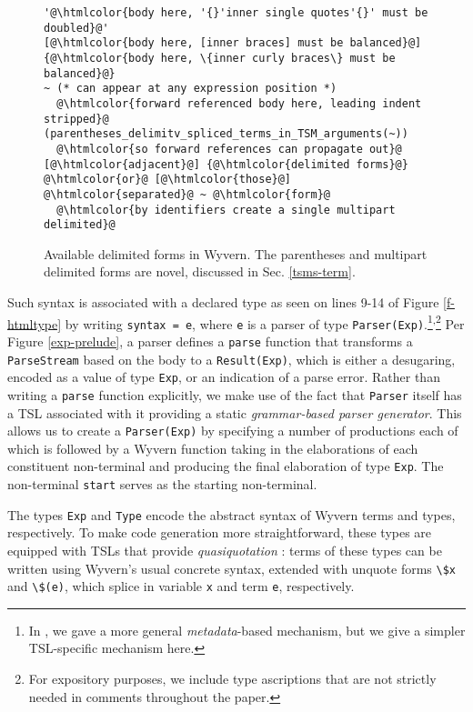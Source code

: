 \documentclass{sig-alternate}[10pt]
\newcommand{\htmlcolor}[1]{\textcolor[HTML]{339933}{#1}}
\newcommand{\mycaption}[1]{\vspace{-10px}\caption{#1}\vspace{-8px}}
\newcommand{\lstinlinew}[1]{\lstinline[style=wyvern]{#1}}
\begin{document}
\begin{figure}[t]
\begin{lstlisting}[style=wyvern,numbers=none,xleftmargin=0px,framexleftmargin=0px]
'@\htmlcolor{body here, '{}'inner single quotes'{}' must be doubled}@'
[@\htmlcolor{body here, [inner braces] must be balanced}@]
{@\htmlcolor{body here, \{inner curly braces\} must be balanced}@}
~ (* can appear at any expression position *)
  @\htmlcolor{forward referenced body here, leading indent stripped}@
(parentheses_delimitv_spliced_terms_in_TSM_arguments(~)) 
  @\htmlcolor{so forward references can propagate out}@
[@\htmlcolor{adjacent}@] {@\htmlcolor{delimited forms}@} @\htmlcolor{or}@ [@\htmlcolor{those}@] @\htmlcolor{separated}@ ~ @\htmlcolor{form}@
  @\htmlcolor{by identifiers create a single multipart delimited}@
\end{lstlisting}
\mycaption{Available delimited forms in Wyvern. The parentheses and multipart delimited forms are novel, discussed in Sec. \ref{tsms-term}.}
\label{f-delimited}
\end{figure}

Such syntax is associated with a declared type as seen on lines 9-14 of Figure \ref{f-htmltype} by writing \lstinline[style=wyvern]{syntax = e}, where \lstinlinew{e} is a parser of type \lstinlinew{Parser(Exp)}.\footnote{ In \cite{TSLs}, we gave a more general \emph{metadata}-based mechanism, but we give a simpler TSL-specific mechanism here.}\textsuperscript{,}\footnote{ For expository purposes, we include type ascriptions that are not strictly needed in comments throughout the paper.} Per  Figure \ref{exp-prelude}, a parser defines a \lstinlinew{parse} function that transforms a \lstinlinew{ParseStream} based on the body to a \lstinlinew{Result(Exp)}, which is either a desugaring, encoded as a value of type \lstinlinew{Exp}, or an indication of a parse error. Rather than writing a \lstinlinew{parse} function explicitly, we make use of the fact that \lstinlinew{Parser} itself has a TSL associated with it providing a static \emph{grammar-based parser generator}. This allows us to create a \lstinlinew{Parser(Exp)} by specifying a number of productions each of which is followed by a Wyvern function taking in the elaborations of each constituent non-terminal and producing the final elaboration of type \lstinlinew{Exp}. The non-terminal \lstinlinew{start} serves as the starting non-terminal. 

The types \lstinlinew{Exp} and \lstinlinew{Type} encode the abstract syntax of Wyvern terms and types, respectively. To make code generation more straightforward, these types are equipped with TSLs that provide \emph{quasiquotation}  \cite{quine40book,Bawd99a,ScalaMacros2013}: terms of these types  can be written using Wyvern's usual concrete syntax, extended with unquote forms \lstinlinew{\$x} and \lstinlinew{\$(e)}, which splice in variable \lstinlinew{x} and  term \lstinlinew{e}, respectively. %
\end{document}
